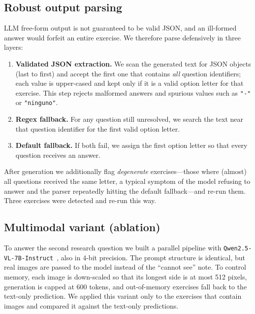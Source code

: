 \documentclass{ceurart}   %
\begin{document}
\subsection{Robust output parsing}
LLM free-form output is not guaranteed to be valid JSON, and an
ill-formed answer would forfeit an entire exercise. We therefore parse
defensively in three layers:
\begin{enumerate}
  \item \textbf{Validated JSON extraction.} We scan the generated text for
        JSON objects (last to first) and accept the first one that contains
        \emph{all} question identifiers; each value is upper-cased and kept
        only if it is a valid option letter for that exercise. This step
        rejects malformed answers and spurious values such as \texttt{"-"}
        or \texttt{"ninguno"}.
  \item \textbf{Regex fallback.} For any question still unresolved, we search
        the text near that question identifier for the first valid option
        letter.
  \item \textbf{Default fallback.} If both fail, we assign the first option
        letter so that every question receives an answer.
\end{enumerate}
After generation we additionally flag \emph{degenerate} exercises---those
where (almost) all questions received the same letter, a typical symptom of
the model refusing to answer and the parser repeatedly hitting the default
fallback---and re-run them. Three exercises were detected and re-run this
way.

\subsection{Multimodal variant (ablation)}
To answer the second research question we built a parallel pipeline with
\texttt{Qwen2.5-VL-7B-Instruct}~\cite{qwen25vl}, also in 4-bit precision. The
prompt structure is identical, but real images are passed to the model
instead of the ``cannot see'' note. To control memory, each image is
down-scaled so that its longest side is at most 512 pixels, generation is
capped at 600 tokens, and out-of-memory exercises fall back to the text-only
prediction. We applied this variant only to the exercises that contain
images and compared it against the text-only predictions.
\end{document}
